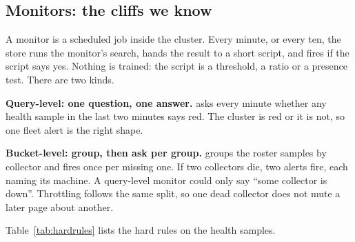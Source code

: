 \subsection{Monitors: the cliffs we know}\label{sec:metrics-monitors}

A monitor is a scheduled job inside the cluster. Every minute, or every ten, the store runs the monitor's search, hands the result to a short script, and fires if the script says yes. Nothing is trained: the script is a threshold, a ratio or a presence test. There are two kinds.

\textbf{Query-level: one question, one answer.}  asks every minute whether any health sample in the last two minutes says red. The cluster is red or it is not, so one fleet alert is the right shape.

\textbf{Bucket-level: group, then ask per group.}  groups the roster samples by collector and fires once per missing one. If two collectors die, two alerts fire, each naming its machine. A query-level monitor could only say ``some collector is down''. Throttling follows the same split, so one dead collector does not mute a later page about another.

Table~\ref{tab:hardrules} lists the hard rules on the health samples.


